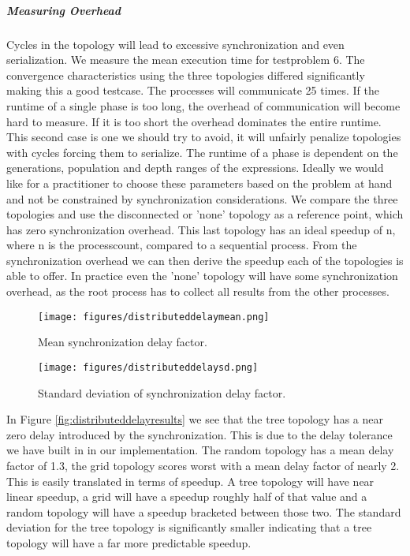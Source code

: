 \subparagraph{Measuring Overhead}
Cycles in the topology will lead to excessive synchronization and even serialization.
We measure the mean execution time for testproblem 6. The convergence characteristics using the three topologies differed significantly making this a good testcase. The processes will communicate 25 times. If the runtime of a single phase is too long, the overhead of communication will become hard to measure. If it is too short the overhead dominates the entire runtime. This second case is one we should try to avoid, it will unfairly penalize topologies with cycles forcing them to serialize. The runtime of a phase is dependent on the generations, population and depth ranges of the expressions. Ideally we would like for a practitioner to choose these parameters based on the problem at hand and not be constrained by synchronization considerations.
We compare the three topologies and use the disconnected or 'none' topology as a reference point, which has zero synchronization overhead.
This last topology has an ideal speedup of n, where n is the processcount, compared to a sequential process. From the synchronization overhead we can then derive the speedup each of the topologies is able to offer. In practice even the 'none' topology will have some synchronization overhead, as the root process has to collect all results from the other processes.
\begin{figure*}
    \centering
    \begin{subfigure}{0.6\textwidth}
    \centering
        \texttt{[image: figures/distributeddelaymean.png]}
        \caption{Mean synchronization delay factor.}
    \end{subfigure}%
    \begin{subfigure}{0.6\textwidth}
    \centering
        \texttt{[image: figures/distributeddelaysd.png]}
        \caption{Standard deviation of synchronization delay factor.}
    \end{subfigure}
    \caption{Synchronization overhead introduced by topologies.}
    \label{fig:distributeddelayresults}
    \end{figure*}
In Figure \ref{fig:distributeddelayresults} we see that the tree topology has a near zero delay introduced by the synchronization. This is due to the delay tolerance we have built in in our implementation. The random topology has a mean delay factor of 1.3, the grid topology scores worst with a mean delay factor of nearly 2. This is easily translated in terms of speedup. A tree topology will have near linear speedup, a grid will have a speedup roughly half of that value and a random topology will have a speedup bracketed between those two. The standard deviation for the tree topology is significantly smaller indicating that a tree topology will have a far more predictable speedup.
